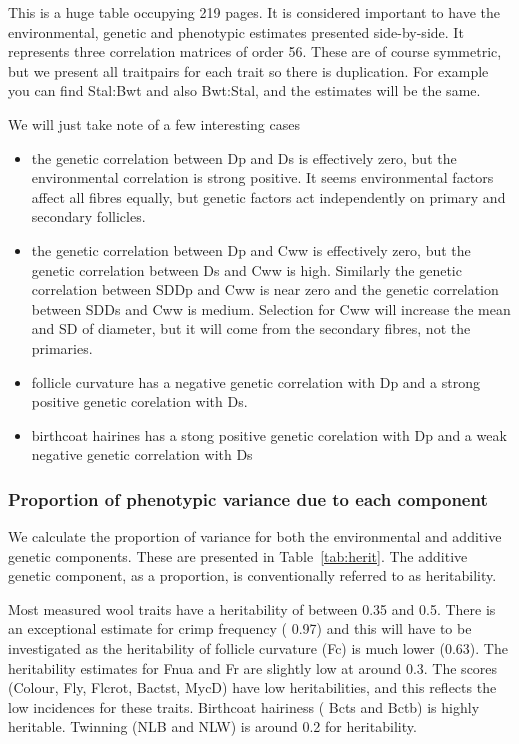 \documentclass[titlepage]{article}  %
\begin{document}
 This is a huge table occupying 219 pages. It is considered important to have the environmental, genetic and phenotypic estimates presented side-by-side. It represents three correlation matrices of order 56. These are of course symmetric, but we present all traitpairs for each trait so there is duplication. For example you can find Stal:Bwt and also Bwt:Stal, and the estimates will be the same.

We will just take note of a few interesting cases
\begin{itemize}
\item the genetic correlation between Dp and Ds is effectively zero, but the environmental correlation is strong positive. It seems environmental factors affect all fibres equally, but genetic factors act independently on primary and secondary follicles.
\item the genetic correlation between Dp and Cww is effectively zero, but the genetic correlation between Ds and Cww is high. Similarly the genetic correlation between SDDp and Cww is near zero and the genetic correlation between SDDs and Cww is medium. Selection for Cww will increase the mean and SD of diameter, but it will come from the secondary fibres, not the primaries.
\item follicle curvature has a negative genetic correlation with Dp and a strong positive genetic corelation with Ds.
\item birthcoat hairines has a stong positive genetic corelation with Dp and a weak negative genetic correlation with Ds
\end{itemize}



\subsubsection{Proportion of phenotypic variance due to each component}
We calculate the proportion of variance for both the environmental and additive genetic components. These are presented in Table~\ref{tab:herit}. The additive genetic component, as a proportion, is conventionally referred to as heritability.

Most measured wool traits have a heritability of between 0.35 and 0.5. There is an exceptional estimate for crimp frequency ( 0.97) and this will have to be investigated as the heritability of follicle curvature  (Fc) is much lower (0.63). The heritability estimates for Fnua and Fr are slightly low at around 0.3. The scores (Colour, Fly, Flcrot, Bactst, MycD) have low heritabilities, and this reflects the low incidences for these traits. Birthcoat hairiness ( Bcts and Bctb) is highly heritable. Twinning (NLB and NLW) is around 0.2 for heritability.
\end{document}
